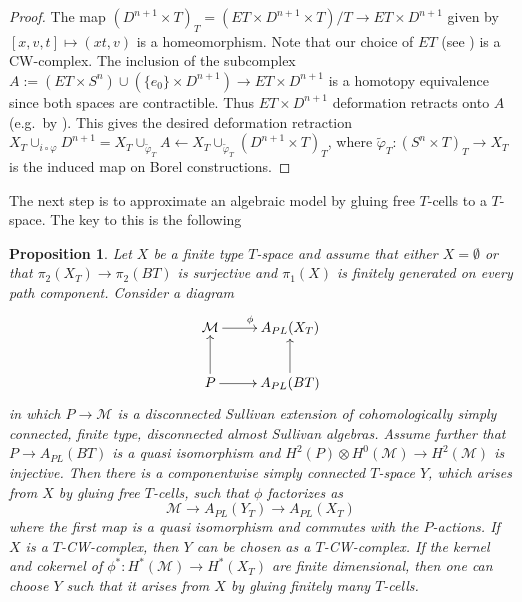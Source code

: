 \documentclass[12pt,a4paper]{article}
\newtheorem{prop}[thm]{Proposition}
\theoremstyle{definition}
\begin{document}
\begin{proof}
The map $(D^{n+1}\times T)_T=(ET\times D^{n+1}\times T)/T\rightarrow ET\times D^{n+1}$ given by $[x,v,t]\mapsto(xt,v)$ is a homeomorphism. Note that our choice of $ET$ (see \cite{Milnor}) is a CW-complex. The inclusion of the subcomplex $A:= (ET\times S^n)\cup (\{e_0\}\times D^{n+1})\rightarrow ET\times D^{n+1}$ is a homotopy equivalence since both spaces are contractible. Thus $ET\times D^{n+1}$ deformation retracts onto $A$ (e.g.\ by \cite[Lemma 4.6]{Hatcher}). This gives the desired deformation retraction $X_T\cup_{i\circ \varphi} D^{n+1}=X_T\cup_{\tilde{\varphi}_T}A\longleftarrow  X_T\cup_{\tilde{\varphi}_T} (D^{n+1}\times T)_T $, where $\tilde{\varphi}_T\colon (S^n\times T)_T\rightarrow X_T$ is the induced map on Borel constructions.
\end{proof}

The next step is to approximate an algebraic model by gluing free $T$-cells to a $T$-space. The key to this is the following

\begin{prop}\label{prop:realization}
Let $X$ be a finite type $T$-space and assume that either $X=\emptyset$ or that $\pi_2(X_T)\rightarrow \pi_2(BT)$ is surjective and $\pi_1(X)$ is finitely generated on every path component. Consider a diagram
\[\xymatrix{
\mathcal{M}\ar[r]^\phi & A_{PL}(X_T)\\
P\ar[u]\ar[r]& A_{PL}(BT)\ar[u]
}\]
in which $P\rightarrow\mathcal{M}$ is a disconnected Sullivan extension of cohomologically simply connected, finite type, disconnected almost Sullivan algebras. Assume further that $P\rightarrow A_{PL}(BT)$ is a quasi isomorphism and $H^2(P)\otimes H^0(\mathcal{M})\rightarrow H^2(\mathcal{M})$ is injective.
Then there is a componentwise simply connected $T$-space $Y$, which arises from $X$ by gluing free $T$-cells, such that $\phi$ factorizes as
\[\mathcal{M}\rightarrow A_{PL}(Y_T)\rightarrow A_{PL}(X_T)\]
where the first map is a quasi isomorphism and commutes with the $P$-actions. If $X$ is a $T$-CW-complex, then $Y$ can be chosen as a $T$-CW-complex. If the kernel and cokernel of $\phi^*\colon H^*(\mathcal{M})\rightarrow H^*(X_T)$ are finite dimensional, then one can choose $Y$ such that it arises from $X$ by gluing finitely many $T$-cells.
\end{prop}
\end{document}
